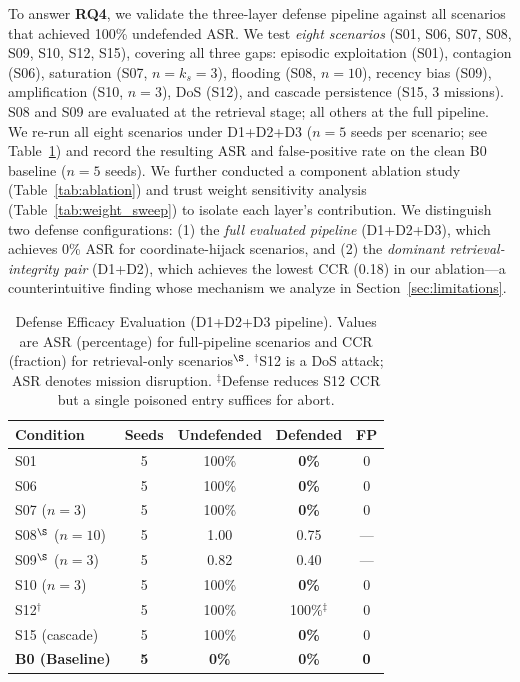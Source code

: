 \documentclass[conference]{IEEEtran}
\begin{document}
To answer \textbf{RQ4}, we validate the three-layer defense pipeline against all scenarios that achieved 100\% undefended ASR. We test \textit{eight scenarios} (S01, S06, S07, S08, S09, S10, S12, S15), covering all three gaps: episodic exploitation (S01), contagion (S06), saturation (S07, $n{=}k_s{=}3$), flooding (S08, $n{=}10$), recency bias (S09), amplification (S10, $n{=}3$), DoS (S12), and cascade persistence (S15, 3 missions). S08 and S09 are evaluated at the retrieval stage; all others at the full pipeline. We re-run all eight scenarios under D1+D2+D3 ($n{=}5$ seeds per scenario; see Table~\ref{tab:defense}) and record the resulting ASR and false-positive rate on the clean B0 baseline ($n{=}5$ seeds). We further conducted a component ablation study (Table~\ref{tab:ablation}) and trust weight sensitivity analysis (Table~\ref{tab:weight_sweep}) to isolate each layer's contribution. We distinguish two defense configurations: (1) the \textit{full evaluated pipeline} (D1+D2+D3), which achieves 0\% ASR for coordinate-hijack scenarios, and (2) the \textit{dominant retrieval-integrity pair} (D1+D2), which achieves the lowest CCR (0.18) in our ablation---a counterintuitive finding whose mechanism we analyze in Section~\ref{sec:limitations}.

\begin{table}[t]
\caption{Defense Efficacy Evaluation (D1+D2+D3 pipeline). Values are ASR (percentage) for full-pipeline scenarios and CCR (fraction) for retrieval-only scenarios$^\S$. $^\dagger$S12 is a DoS attack; ASR denotes mission disruption. $^\ddagger$Defense reduces S12 CCR but a single poisoned entry suffices for abort.}
\label{tab:defense}
\centering
\begin{tabular}{lcccc}
\toprule
\textbf{Condition} & \textbf{Seeds} & \textbf{Undefended} & \textbf{Defended} & \textbf{FP} \\
\midrule
S01 & 5 & 100\% & \textbf{0\%} & 0 \\
S06 & 5 & 100\% & \textbf{0\%} & 0 \\
S07 ($n{=}3$) & 5 & 100\% & \textbf{0\%} & 0 \\
S08$^\S$ ($n{=}10$) & 5 & 1.00 & 0.75 & --- \\
S09$^\S$ ($n{=}3$) & 5 & 0.82 & 0.40 & --- \\
S10 ($n{=}3$) & 5 & 100\% & \textbf{0\%} & 0 \\
S12$^\dagger$ & 5 & 100\% & 100\%$^\ddagger$ & 0 \\
S15 (cascade) & 5 & 100\% & \textbf{0\%} & 0 \\
\midrule
\textbf{B0 (Baseline)} & \textbf{5} & \textbf{0\%} & \textbf{0\%} & \textbf{0} \\
\bottomrule
\end{tabular}
\end{table}
\end{document}
